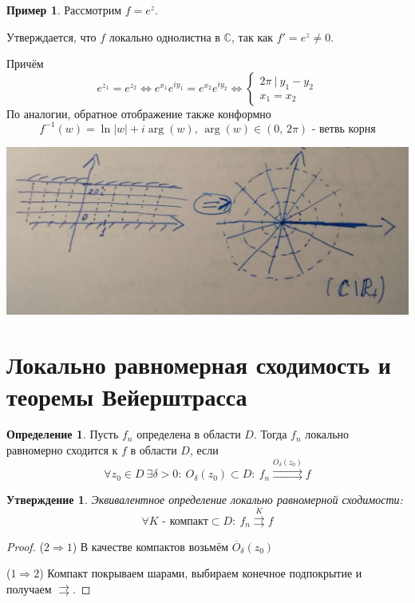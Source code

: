 \documentclass[a4paper,12pt]{article}
\theoremstyle{plain}
\newtheorem{proposition}{Утверждение}[section]
\theoremstyle{definition}
\newtheorem{definition}{Определение}[section]
\newtheorem*{example}{Пример}
\theoremstyle{remark}
\begin{document}
\begin{example}
	Рассмотрим $f = e^z$.

	Утверждается, что $f$ локально однолистна в $\mathbb{C}$, так как $f' = e^z \neq 0$.

	Причём
	\[
		e^{z_1} = e^{z_2} \Leftrightarrow e^{x_1}e^{iy_1} = e^{x_2}e^{iy_2} \Leftrightarrow \begin{cases}
			2\pi \:\vert\: y_1 - y_2 \\
			x_1 = x_2
		\end{cases}
	\]
	По аналогии, обратное отображение также конформно
	\[
		f^{-1}(w) = \ln\vert w\vert + i\arg(w),\, \arg(w) \in (0,\, 2\pi) \text{ - ветвь корня}
	\]

	\includegraphics[scale=0.3]{assets/exp_ex.png}
\end{example}

\section{Локально равномерная сходимость и теоремы Вейерштрасса}
\begin{definition}
	Пусть $f_n$ определена в области $D$. Тогда $f_n$ локально равномерно сходится к $f$ в области $D$, если
	\[
		\forall z_0 \in D \: \exists \delta > 0 :\: O_\delta(z_0) \subset D :\: f_n \overset{O_\delta(z_0)}{\rightrightarrows} f
	\]
\end{definition}

\begin{proposition}
	Эквивалентное определение локально равномерной сходимости:
	\[
		\forall K \text{ - компакт}\subset D :\: f_n \overset{K}{\rightrightarrows} f
	\]
\end{proposition}

\begin{proof}
	($2 \Rightarrow 1$) В качестве компактов возьмём $\overline{O}_\delta(z_0)$

	($1 \Rightarrow 2$) Компакт покрываем шарами, выбираем конечное подпокрытие и получаем $\rightrightarrows$.
\end{proof}
\end{document}
